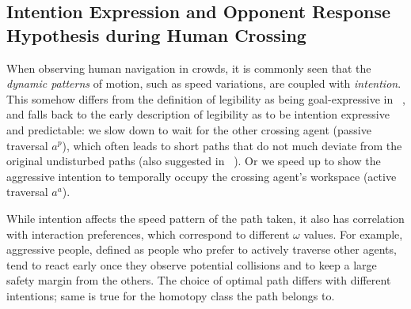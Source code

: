 \documentclass[conference]{IEEEtran}
\begin{document}
\subsection{Intention Expression and Opponent Response Hypothesis during Human Crossing}
When observing human navigation in crowds, it is commonly seen that the 
\textit{dynamic patterns} of motion, such as speed variations, are coupled 
with \textit{intention}. This somehow differs from the 
definition of legibility as being goal-expressive in 
~\cite{dragan2013legibility}, and falls back to the early description of 
legibility as to be intention 
expressive and predictable: we slow down to wait for the other crossing agent 
(passive traversal $a^p$), which often leads to short paths that do not much 
deviate from the original undisturbed paths (also suggested in 
~\cite{kruse2012legible}). Or we speed up to show the 
aggressive intention to temporally occupy the crossing agent's workspace (active 
traversal $a^a$). 

While intention affects the speed pattern of the path taken, it also has 
correlation with interaction preferences, which correspond to different $\omega$ 
values. For example, aggressive people, defined as people who prefer to actively traverse 
other agents, tend to react early once they observe potential collisions and 
to keep a large safety margin from the others. The choice of optimal path 
differs with different intentions; same is true for the homotopy class the 
path belongs to.
\end{document}
